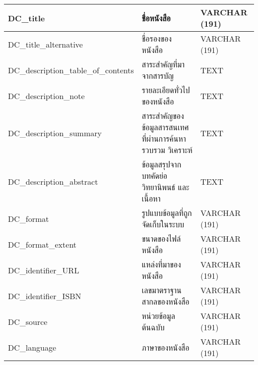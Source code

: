 \begin{longtable}[l]{|l|l|l|}
DC\_title                            & ชื่อหนังสือ                                                   & VARCHAR (191)                                                        \\ \hline
DC\_title\_alternative               & ชื่อรองของหนังสือ                                             & VARCHAR (191)                                                        \\ \hline
DC\_description\_table\_of\_contents & สาระสำคัญที่มาจากสารบัญ                                      & TEXT                                                                 \\ \hline
DC\_description\_note                & รายละเอียดทั่วไปของหนังสือ                                    & TEXT                                                                 \\ \hline
DC\_description\_summary             & สาระสำคัญของข้อมูลสารสนเทศที่ผ่านการค้นหา   รวบรวม วิเคราะห์ & TEXT                                                                 \\ \hline
DC\_description\_abstract            & ข้อมูลสรุปจากบทคัดย่อ   วิทยานิพนธ์ และเนื้อหา               & TEXT                                                                 \\ \hline
DC\_format                           & รูปแบบข้อมูลที่ถูกจัดเก็บในระบบ                              & VARCHAR (191)                                                        \\ \hline
DC\_format\_extent                   & ขนาดของไฟล์หนังสือ                                            & VARCHAR (191)                                                        \\ \hline
DC\_identifier\_URL                  & แหล่งที่มาของหนังสือ                                          & VARCHAR   (191)                                                      \\ \hline
DC\_identifier\_ISBN                 & เลขมาตราฐานสากลของหนังสือ                                     & VARCHAR   (191)                                                      \\ \hline
DC\_source                           & หน่วยข้อมูลต้นฉบับ                                           & VARCHAR   (191)                                                      \\ \hline
DC\_language                         & ภาษาของหนังสือ                                                & VARCHAR   (191)                                                      \\ \hline

\end{longtable}
